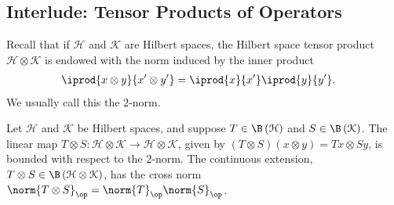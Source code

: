 \documentclass[10pt]{mypackage}
\begin{document}
\subsection{Interlude: Tensor Products of Operators}%
Recall that if $\mathcal{H}$ and $\mathcal{K}$ are Hilbert spaces, the Hilbert space tensor product $\mathcal{H}\otimes \mathcal{K}$ is endowed with the norm induced by the inner product
\begin{align*}
  \iprod{x\otimes y}{x'\otimes y'} &= \iprod{x}{x'} \iprod{y}{y'}.
\end{align*}
We usually call this the $2$-norm.
\begin{proposition}
  Let $\mathcal{H}$ and $\mathcal{K}$ be Hilbert spaces, and suppose $T\in \B\left( \mathcal{H} \right)$ and $S\in \B\left( \mathcal{K} \right)$. The linear map $T\otimes S\colon \mathcal{H}\otimes \mathcal{K}\rightarrow \mathcal{H}\otimes \mathcal{K}$, given by $\left( T\otimes S \right)\left( x\otimes y \right)= Tx\otimes Sy$, is bounded with respect to the $2$-norm. The continuous extension, $T\otimes S\in \B\left( \mathcal{H}\otimes \mathcal{K} \right)$, has the cross norm $\norm{T\otimes S}_{\op} = \norm{T}_{\op}\norm{S}_{\op}$.
\end{proposition}
\end{document}
